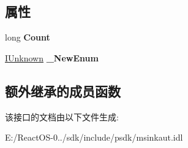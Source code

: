 \subsection*{属性}
\begin{DoxyCompactItemize}
\item 
\mbox{\label{interface_m_s_i_n_k_a_u_t_lib_1_1_i_ink_custom_strokes_a15ed3822b29941bff2b0b09c4f3e06bb}} 
long {\bfseries Count}
\item 
\mbox{\label{interface_m_s_i_n_k_a_u_t_lib_1_1_i_ink_custom_strokes_ab840888fd6b8c17f54132cf1fe7b8060}} 
\hyperlink{interface_i_unknown}{I\+Unknown} {\bfseries \+\_\+\+New\+Enum}
\end{DoxyCompactItemize}
\subsection*{额外继承的成员函数}


该接口的文档由以下文件生成\+:\begin{DoxyCompactItemize}
\item 
E\+:/\+React\+O\+S-\/0../sdk/include/psdk/msinkaut.\+idl\end{DoxyCompactItemize}
